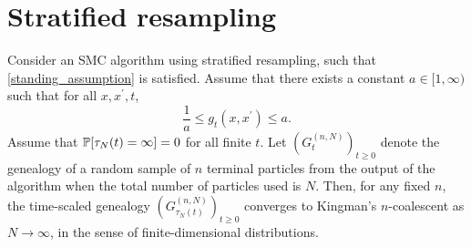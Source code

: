 \section{Stratified resampling \seb{$\checkmark$} }

\begin{corollary}\label{thm:stratified}
Consider an SMC algorithm using stratified resampling, such that \ref{standing_assumption} is satisfied.
Assume that there exists a constant $a\in [1,\infty)$ such that for all $x, x^\prime, t$,
\begin{equation}\label{eq:gq_bounds_sr}
\frac{1}{a} \leq g_t(x, x^\prime) \leq a .
\end{equation}
Assume that $\mathbb{P}[ \tau_N(t) = \infty] =0$ for all finite $t$.
Let $(G_t^{(n,N)})_{t\geq0}$ denote the genealogy of a random sample of $n$ terminal particles from the output of the algorithm when the total number of particles used is $N$. Then, for any fixed $n$, the time-scaled genealogy $(G_{\tau_N(t)}^{(n,N)})_{t\geq0}$ converges to Kingman's $n$-coalescent as $N\to \infty$, in the sense of finite-dimensional distributions.
\end{corollary}



